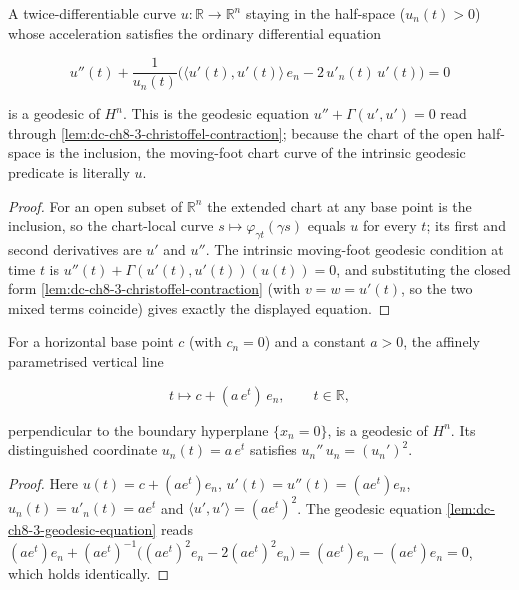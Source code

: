 \begin{lemma}
  \label{lem:dc-ch8-3-geodesic-equation}


  A twice-differentiable curve $u:\mathbb R\to\mathbb R^n$ staying in the
  half-space ($u_n(t)>0$) whose acceleration satisfies the ordinary differential
  equation

  $$
  u''(t)+\frac{1}{u_n(t)}\Big(\langle u'(t),u'(t)\rangle\, e_n-2\,u'_n(t)\,u'(t)\Big)=0
  $$

  is a geodesic of $H^n$. This is the geodesic equation $u''+\Gamma(u',u')=0$ read
  through \cref{lem:dc-ch8-3-christoffel-contraction}; because the chart of the open
  half-space is the inclusion, the moving-foot chart curve of the intrinsic geodesic
  predicate is literally $u$.
\end{lemma}
\begin{proof}

\sketch
  For an open subset of $\mathbb R^n$ the extended chart at any base point is the
  inclusion, so the chart-local curve $s\mapsto\varphi_{\gamma t}(\gamma s)$ equals
  $u$ for every $t$; its first and second derivatives are $u'$ and $u''$. The
  intrinsic moving-foot geodesic condition at time $t$ is
  $u''(t)+\Gamma(u'(t),u'(t))(u(t))=0$, and substituting the closed form
  \cref{lem:dc-ch8-3-christoffel-contraction} (with $v=w=u'(t)$, so the two mixed
  terms coincide) gives exactly the displayed equation.
\end{proof}

\begin{lemma}
  \label{lem:dc-ch8-3-vertical-geodesic}


  For a horizontal base point $c$ (with $c_n=0$) and a constant $a>0$, the affinely
  parametrised vertical line

  $$
  t\longmapsto c+(a\,e^{t})\,e_n,\qquad t\in\mathbb R,
  $$

  perpendicular to the boundary hyperplane $\{x_n=0\}$, is a geodesic of $H^n$. Its
  distinguished coordinate $u_n(t)=a\,e^{t}$ satisfies $u_n''\,u_n=(u_n')^2$.
\end{lemma}
\begin{proof}

\sketch
  Here $u(t)=c+(a e^{t})e_n$, $u'(t)=u''(t)=(a e^{t})e_n$, $u_n(t)=u'_n(t)=a e^{t}$
  and $\langle u',u'\rangle=(a e^{t})^2$. The geodesic equation
  \cref{lem:dc-ch8-3-geodesic-equation} reads
  $(a e^{t})e_n+(a e^{t})^{-1}\big((a e^{t})^2 e_n-2(a e^{t})^2 e_n\big)
  =(a e^{t})e_n-(a e^{t})e_n=0$, which holds identically.
\end{proof}

